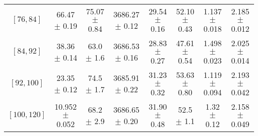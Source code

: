\begin{tabular}{c||c|c|c|c|c|c|c}
$[76, 84]$ & 66.47 $\pm$ 0.19 & 75.07 $\pm$ 0.84 & 3686.27 $\pm$ 0.12 & 29.54 $\pm$ 0.16 & 52.10 $\pm$ 0.43 & 1.137 $\pm$ 0.018 & 2.185 $\pm$ 0.012\\
$[84, 92]$ & 38.36 $\pm$ 0.14 & 63.0 $\pm$ 1.6 & 3686.53 $\pm$ 0.16 & 28.83 $\pm$ 0.27 & 47.61 $\pm$ 0.54 & 1.498 $\pm$ 0.023 & 2.025 $\pm$ 0.014\\
$[92, 100]$ & 23.35 $\pm$ 0.12 & 74.5 $\pm$ 1.7 & 3685.91 $\pm$ 0.22 & 31.23 $\pm$ 0.32 & 53.63 $\pm$ 0.80 & 1.119 $\pm$ 0.094 & 2.193 $\pm$ 0.042\\
$[100, 120]$ & 10.952 $\pm$ 0.052 & 68.2 $\pm$ 2.9 & 3686.65 $\pm$ 0.20 & 31.90 $\pm$ 0.48 & 52.5 $\pm$ 1.1 & 1.32 $\pm$ 0.12 & 2.158 $\pm$ 0.049\\
\end{tabular}
